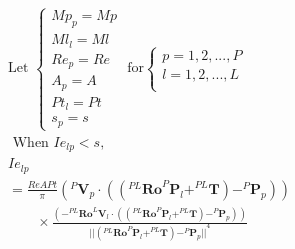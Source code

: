\begin{description}
            \begin{equation}
                \label{eqn:model_no_lamb}
                \begin{aligned}
                    &\text{Let }
                    \begin{cases}
                        Mp_p=Mp\\Ml_l=Ml\\Re_p=Re\\A_p=A\\Pt_l=Pt\\s_p=s
                    \end{cases}
                    \text{ for}
                    \begin{cases}
                        p = 1,2,...,P\\
                        l = 1,2,...,L\\
                    \end{cases}\\
                    &\text { When } Ie_{lp}<s ,\\
                    &Ie_{lp} \\
                        &= \frac{ReAPt}{ \pi}
                        {( ^{P}\boldsymbol{V}_p \cdot 
                                (
                                    (
                                        ^{PL} \boldsymbol{Ro}^{P}\boldsymbol{P}_l
                                        + ^{PL}\boldsymbol{T}
                                    )
                                    - ^{P}\boldsymbol{P}_p
                                )
                            )}\\
                    & \qquad \times
                        \frac{  
                            (
                                -^{PL}\boldsymbol{Ro}^{L}\boldsymbol{V}_l 
                                \cdot 
                                (
                                    (
                                        ^{PL}\boldsymbol{Ro}^{P}\boldsymbol{P}_l
                                        +^{PL}\boldsymbol{T}
                                    )
                                    - ^{P}\boldsymbol{P}_p
                                )
                            )
                        } 
                        {
                            {
                                ||
                                    (^{PL}\boldsymbol{Ro}^{P}\boldsymbol{P}_l+^{PL}\boldsymbol{T})
                                    - ^{P}\boldsymbol{P}_p
                                ||
                            }^{4}
                        }\\
                \end{aligned}
            \end{equation}


\end{description}
